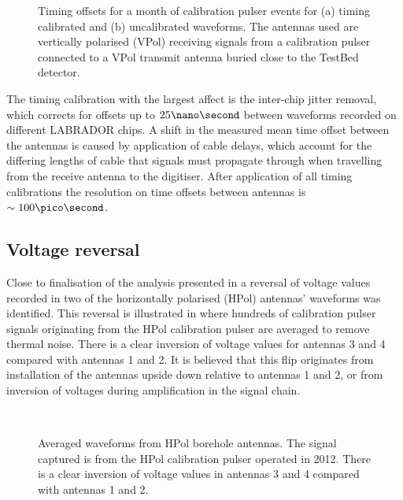 \begin{figure}[htpb]
  \hfill
  \caption{Timing offsets for a month of calibration pulser events for (a) timing calibrated and (b) uncalibrated waveforms. The antennas used are vertically polarised (VPol) receiving signals from a calibration pulser connected to a VPol transmit antenna buried close to the TestBed detector.}
  \label{fig:calibration:LABRADOR-Digitiser-Chip:Timing-Differences}
\end{figure}

The timing calibration with the largest affect is the inter-chip jitter removal, which corrects for offsets up to $25 \nano \second$ between waveforms recorded on different LABRADOR chips. A shift in the measured mean time offset between the antennas is caused by application of cable delays, which account for the differing lengths of cable that signals must propagate through when travelling from the receive antenna to the digitiser. After application of all timing calibrations the resolution on time offsets between antennas is $\sim 100 \pico \second$.


\subsection{Voltage reversal}
\label{sec:calibration:Voltage-reversal}

Close to finalisation of the analysis presented in  a reversal of voltage values recorded in two of the horizontally polarised (HPol) antennas' waveforms was identified. This reversal is illustrated in  where hundreds of calibration pulser signals originating from the HPol calibration pulser are averaged to remove thermal noise. There is a clear inversion of voltage values for antennas 3 and 4 compared with antennas 1 and 2. It is believed that this flip originates from installation of the antennas upside down relative to antennas 1 and 2, or from inversion of voltages during amplification in the signal chain. 

\begin{figure}[htpb]
  \hfill
  \\
  \hfill
\caption{Averaged waveforms from HPol borehole antennas. The signal captured is from the HPol calibration pulser operated in 2012. There is a clear inversion of voltage values in antennas 3 and 4 compared with antennas 1 and 2.}
\label{fig:calibration:Voltage-Reversal}
\end{figure}



